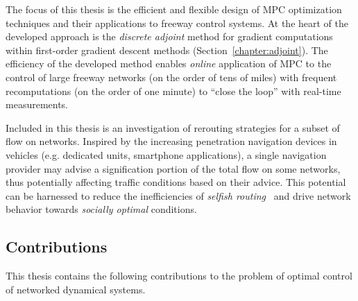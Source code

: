The focus of this thesis is the efficient and flexible design of MPC optimization techniques and their applications to freeway control systems. At the heart of the developed approach is the \emph{discrete adjoint} method for gradient computations within first-order gradient descent methods (Section~\ref{chapter:adjoint}). The efficiency of the developed method enables \emph{online} application of MPC to the control of large freeway networks (on the order of tens of miles) with frequent recomputations (on the order of one minute) to ``close the loop'' with real-time measurements.

Included in this thesis is an investigation of rerouting strategies for a subset of flow on networks. Inspired by the increasing penetration navigation devices in vehicles (e.g. dedicated units, smartphone applications), a single navigation provider may advise a signification portion of the total flow on some networks, thus potentially affecting traffic conditions based on their advice. This potential can be harnessed to reduce the inefficiencies of \emph{selfish routing}~\cite{Krichene2012c,Roughgarden2002How} and drive network behavior towards \emph{socially optimal} conditions.

\subsection{Contributions}
\label{sec:contributions}

This thesis contains the following contributions to the problem of optimal control of networked dynamical systems.

